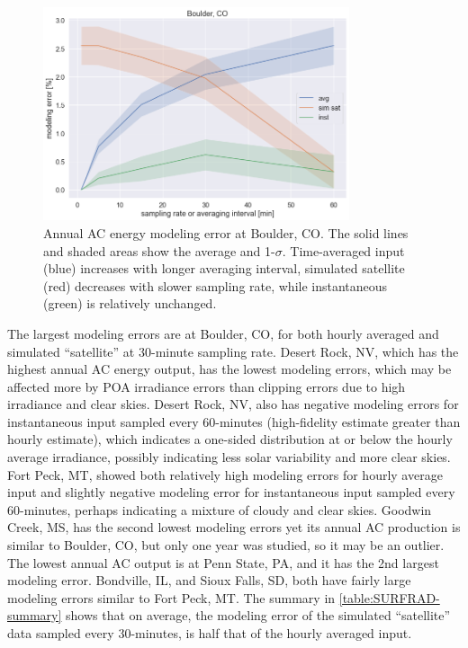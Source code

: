 \documentclass[conference]{IEEEtran}
\begin{document}
\begin{figure}[htbp]
\centerline{\includegraphics[width=9cm]{analysis/tbl_all.png}}
\caption{Annual AC energy modeling error at Boulder, CO. The solid lines and shaded areas show the average and 1-$\sigma$. Time-averaged input (blue) increases with longer averaging interval, simulated satellite (red) decreases with slower sampling rate, while instantaneous (green) is relatively unchanged.}
\label{fig:tbl2010}
\end{figure}

The largest modeling errors are at Boulder, CO, for both hourly averaged and simulated ``satellite'' at 30-minute sampling rate. Desert Rock, NV, which has the highest annual AC energy output, has the lowest modeling errors, which may be affected more by POA irradiance errors than clipping errors due to high irradiance and clear skies. Desert Rock, NV, also has negative modeling errors for instantaneous input sampled every 60-minutes (high-fidelity estimate greater than hourly estimate), which indicates a one-sided distribution at or below the hourly average irradiance, possibly indicating less solar variability and more clear skies. Fort Peck, MT, showed both relatively high modeling errors for hourly average input and slightly negative modeling error for instantaneous input sampled every 60-minutes, perhaps indicating a mixture of cloudy and clear skies. Goodwin Creek, MS, has the second lowest modeling errors yet its annual AC production is similar to Boulder, CO, but only one year was studied, so it may be an outlier. The lowest annual AC output is at Penn State, PA, and it has the 2nd largest modeling error. Bondville, IL, and Sioux Falls, SD, both have fairly large modeling errors similar to Fort Peck, MT. The summary in \ref{table:SURFRAD-summary} shows that on average, the modeling error of the simulated ``satellite'' data sampled every 30-minutes, is half that of the hourly averaged input.
\end{document}
